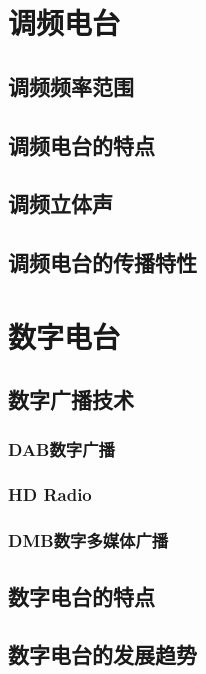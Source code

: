 \documentclass[12pt,UTF8]{ctexbook}
\begin{document}
\chapter{调频电台}

\section{调频频率范围}

\section{调频电台的特点}

\section{调频立体声}

\section{调频电台的传播特性}

\chapter{数字电台}

\section{数字广播技术}

\subsection{DAB数字广播}

\subsection{HD Radio}

\subsection{DMB数字多媒体广播}

\section{数字电台的特点}

\section{数字电台的发展趋势}
\end{document}
